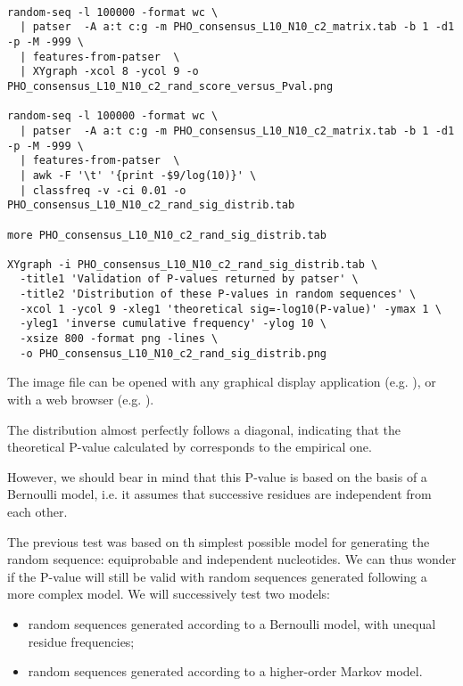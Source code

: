{\color{Blue} \begin{footnotesize} 
\begin{verbatim}

random-seq -l 100000 -format wc \
  | patser  -A a:t c:g -m PHO_consensus_L10_N10_c2_matrix.tab -b 1 -d1  -p -M -999 \
  | features-from-patser  \
  | XYgraph -xcol 8 -ycol 9 -o PHO_consensus_L10_N10_c2_rand_score_versus_Pval.png

random-seq -l 100000 -format wc \
  | patser  -A a:t c:g -m PHO_consensus_L10_N10_c2_matrix.tab -b 1 -d1  -p -M -999 \
  | features-from-patser  \
  | awk -F '\t' '{print -$9/log(10)}' \
  | classfreq -v -ci 0.01 -o PHO_consensus_L10_N10_c2_rand_sig_distrib.tab

more PHO_consensus_L10_N10_c2_rand_sig_distrib.tab

XYgraph -i PHO_consensus_L10_N10_c2_rand_sig_distrib.tab \
  -title1 'Validation of P-values returned by patser' \
  -title2 'Distribution of these P-values in random sequences' \
  -xcol 1 -ycol 9 -xleg1 'theoretical sig=-log10(P-value)' -ymax 1 \
  -yleg1 'inverse cumulative frequency' -ylog 10 \
  -xsize 800 -format png -lines \
  -o PHO_consensus_L10_N10_c2_rand_sig_distrib.png 

\end{verbatim} \end{footnotesize}
}


The image file can be opened with any graphical display application
(e.g. \program{xv}), or with a web browser (e.g. ).

The distribution almost perfectly follows a diagonal, indicating that
the theoretical P-value calculated by \program{patser} corresponds to
the empirical one. 

However, we should bear in mind that this P-value is based on the
basis of a Bernoulli model, i.e. it assumes that successive residues
are independent from each other. 


The previous test was based on th simplest possible model for
generating the random sequence: equiprobable and independent
nucleotides.  We can thus wonder if the P-value will still be valid
with random sequences generated following a more complex model. We
will successively test two models:

\begin{itemize}
\item random sequences generated according to a Bernoulli model, with
  unequal residue frequencies;
\item random sequences generated according to a higher-order Markov
  model.
\end{itemize}

